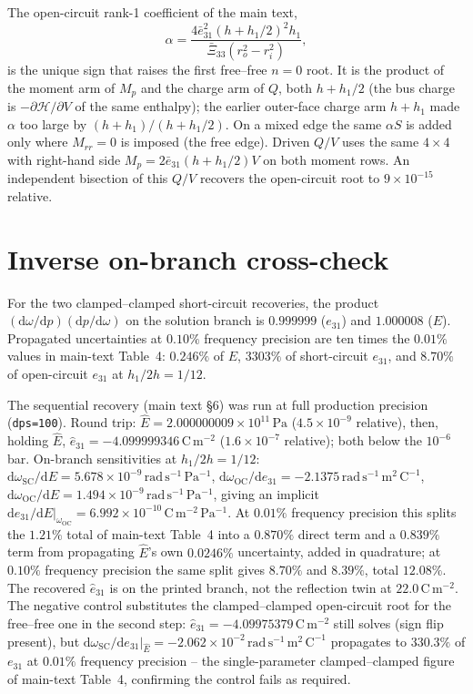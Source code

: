 \documentclass[11pt]{article}
\newcommand{\eebar}{\bar{e}_{31}}
\newcommand{\Xibar}{\bar{\Xi}_{33}}
\begin{document}
The open-circuit rank-1 coefficient of the main text,
\begin{equation}
\alpha=\frac{4\eebar^2 (h+h_1/2)^2h_1}{\Xibar(r_o^2-r_i^2)},
\end{equation}
is the unique sign that raises the first free--free $n=0$ root. It is
the product of the moment arm of $M_p$ and the charge arm of $Q$, both
$h+h_1/2$ (the bus charge is $-\partial\mathcal H/\partial V$ of the same
enthalpy); the earlier outer-face charge arm $h+h_1$ made $\alpha$ too
large by $(h+h_1)/(h+h_1/2)$. On a
mixed edge the same $\alpha S$ is added only where $M_{rr}=0$ is
imposed (the free edge). Driven
$Q/V$ uses the same $4\times4$ with right-hand side
$M_p=2\eebar(h+h_1/2)V$ on both moment rows. An independent bisection
of this $Q/V$ recovers the open-circuit root to $9\times10^{-15}$
relative.

\section{Inverse on-branch cross-check}
\label{sec:s2}
For the two clamped--clamped short-circuit recoveries, the product
$(\mathrm{d}\omega/\mathrm{d}p)(\mathrm{d}p/\mathrm{d}\omega)$ on the
solution branch is $0.999999$ ($e_{31}$) and $1.000008$ ($E$).
Propagated uncertainties at $0.10\%$ frequency precision are ten times
the $0.01\%$ values in main-text Table~4: $0.246\%$ of $E$, $3303\%$ of
short-circuit $e_{31}$, and $8.70\%$ of open-circuit $e_{31}$ at
$h_1/2h=1/12$.

The sequential recovery (main text \S6) was run at full production
precision (\texttt{dps=100}). Round trip:
$\hat E=2.000000009\times10^{11}\,\mathrm{Pa}$
($4.5\times10^{-9}$ relative), then, holding $\hat E$,
$\hat e_{31}=-4.099999346\,\mathrm{C\,m^{-2}}$
($1.6\times10^{-7}$ relative); both below the $10^{-6}$ bar. On-branch
sensitivities at $h_1/2h=1/12$:
$\mathrm{d}\omega_{\mathrm{SC}}/\mathrm{d}E=5.678\times10^{-9}\,\mathrm{rad\,s^{-1}\,Pa^{-1}}$,
$\mathrm{d}\omega_{\mathrm{OC}}/\mathrm{d}e_{31}=-2.1375\,\mathrm{rad\,s^{-1}\,m^2\,C^{-1}}$,
$\mathrm{d}\omega_{\mathrm{OC}}/\mathrm{d}E=1.494\times10^{-9}\,\mathrm{rad\,s^{-1}\,Pa^{-1}}$,
giving an implicit $\mathrm{d}e_{31}/\mathrm{d}E|_{\omega_{\mathrm{OC}}}=6.992\times10^{-10}\,\mathrm{C\,m^{-2}\,Pa^{-1}}$.
At $0.01\%$ frequency precision this splits the $1.21\%$ total of
main-text Table~4 into a $0.870\%$ direct term and a $0.839\%$ term from
propagating $\hat E$'s own $0.0246\%$ uncertainty, added in quadrature;
at $0.10\%$ frequency precision the same split gives $8.70\%$ and
$8.39\%$, total $12.08\%$. The recovered $\hat e_{31}$ is on the printed
branch, not the reflection twin at $22.0\,\mathrm{C\,m^{-2}}$. The
negative control substitutes the clamped--clamped
open-circuit root for the free--free one in the second step:
$\hat e_{31}=-4.09975379\,\mathrm{C\,m^{-2}}$ still solves (sign flip
present), but
$\mathrm{d}\omega_{\mathrm{SC}}/\mathrm{d}e_{31}|_{\hat E}=-2.062\times10^{-2}\,\mathrm{rad\,s^{-1}\,m^2\,C^{-1}}$
propagates to $330.3\%$ of $e_{31}$ at $0.01\%$ frequency precision --
the single-parameter clamped--clamped figure of
main-text Table~4, confirming the control fails as required.
\end{document}
